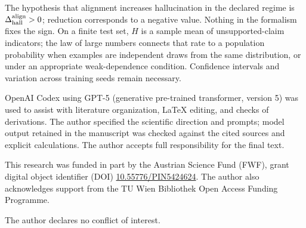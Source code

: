 \documentclass[
  aps,
  reprint,
  superscriptaddress,
  floatfix,
  nofootinbib,
  longbibliography
]{revtex4-2}
\begin{document}
The hypothesis that alignment increases hallucination in the declared regime
is $\Delta_{\rm hall}^{\rm align}>0$; reduction corresponds to a negative
value.  Nothing in the formalism fixes the sign.  On a finite test set, $H$ is
a sample mean of unsupported-claim indicators; the law of large numbers
connects that rate to a population probability when examples are independent
draws from the same distribution, or under an appropriate weak-dependence
condition.  Confidence intervals and variation across training seeds remain
necessary.

\begin{acknowledgments}
OpenAI Codex using GPT-5 (generative pre-trained transformer, version 5) was
used to assist with literature organization, \LaTeX{}
editing, and checks of derivations.  The author specified the scientific
direction and prompts; model output retained in the manuscript was checked
against the cited sources and explicit calculations.  The author accepts full
responsibility for the final text.

This research was funded in part by the Austrian Science Fund (FWF), grant
digital object identifier (DOI)
\href{https://doi.org/10.55776/PIN5424624}{10.55776/PIN5424624}.
The author also acknowledges support from the TU Wien Bibliothek Open Access
Funding Programme.

The author declares no conflict of interest.
\end{acknowledgments}

\clearpage


\end{document}
